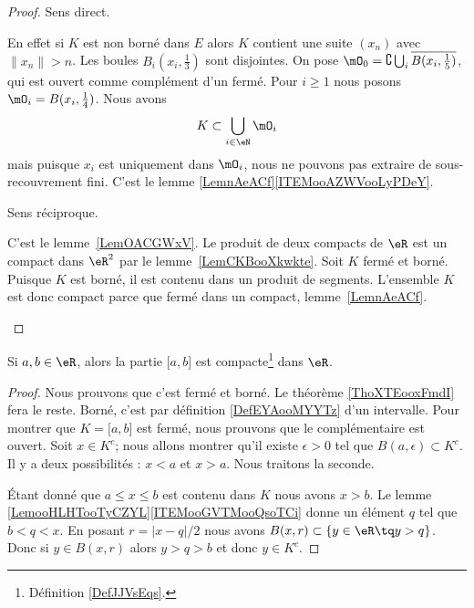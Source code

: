 \begin{proof}
	Sens direct.
	\begin{subproof}
		En effet si \( K\) est non borné dans \( E\) alors \( K\) contient une suite \( (x_n)\) avec \( \| x_n \|>n\). Les boules \( B_i(x_i,\frac{ 1 }{3})\) sont disjointes. On pose \( \mO_0=\complement\bigcup_i\overline{ B(x_i,\frac{1}{ 5 }) }\), qui est ouvert comme complément d'un fermé. Pour \( i\geq 1\) nous posons \( \mO_i=B(x_i,\frac{1}{ 4 })\). Nous avons
		\begin{equation}
			K\subset\bigcup_{i\in \eN}\mO_i
		\end{equation}
		mais puisque \( x_i\) est uniquement dans \( \mO_i\), nous ne pouvons pas extraire de sous-recouvrement fini.
		C'est le lemme \ref{LemnAeACf}\ref{ITEMooAZWVooLyPDeY}.
	\end{subproof}
	Sens réciproque.
	\begin{subproof}
		C'est le lemme~\ref{LemOACGWxV}.
		Le produit de deux compacts de \( \eR\) est un compact dans \( \eR^2\) par le lemme~\ref{LemCKBooXkwkte}.
		Soit \( K\) fermé et borné. Puisque \( K\) est borné, il est contenu dans un produit de segments. L'ensemble \( K\) est donc compact parce que fermé dans un compact, lemme~\ref{LemnAeACf}.
	\end{subproof}
\end{proof}


\begin{lemma}       \label{LEMooNNHYooITNbyz}
	Si \( a,b\in \eR\), alors la partie \( \mathopen[ a , b \mathclose]\) est compacte\footnote{Définition \ref{DefJJVsEqs}.} dans \( \eR\).
\end{lemma}

\begin{proof}
	Nous prouvons que c'est fermé et borné. Le théorème \ref{ThoXTEooxFmdI} fera le reste. Borné, c'est par définition \ref{DefEYAooMYYTz} d'un intervalle. Pour montrer que \( K=\mathopen[ a,b\mathclose]\) est fermé, nous prouvons que le complémentaire est ouvert. Soit \( x\in K^c\); nous allons montrer qu'il existe \( \epsilon>0\) tel que \( B(a,\epsilon)\subset K^c\). Il y a deux possibilités : \( x<a\) et \( x>a\). Nous traitons la seconde.

	Étant donné que \( a\leq x\leq b\) est contenu dans \( K\) nous avons \( x>b\). Le lemme \ref{LemooHLHTooTyCZYL}\ref{ITEMooGVTMooQsoTCi} donne un élément \( q\) tel que \( b<q<x\). En posant \( r=| x-q |/2\) nous avons \( B(x,r)\subset \{ y\in \eR\tq y>q \}\). Donc si \( y\in B(x,r)\) alors \( y>q>b\) et donc \( y\in K^c\).
\end{proof}

